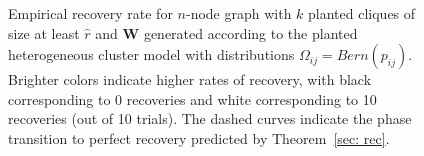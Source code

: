\documentclass[twoside,11pt]{article}
\newcommand{\bs}{\boldsymbol}
\newcommand{\W}{\bs {W}}
\newcommand{\0}{\bs{0}}
\begin{document}
\begin{figure}[t]
	\centering
		\caption{Empirical recovery rate for $n$-node graph with $k$ planted cliques of size at least $\hat r$ and \(\W\) generated
		according to the planted heterogeneous cluster model with distributions $\Omega_{ij} = Bern(p_{ij})$. Brighter colors indicate higher
		rates of recovery, with black corresponding to 0 recoveries and white corresponding to 10 recoveries (out of 10 trials).
		The dashed curves indicate the phase transition to perfect recovery predicted by Theorem~\ref{sec: rec}.}
	\label{fig: rec}
\end{figure}
\end{document}
